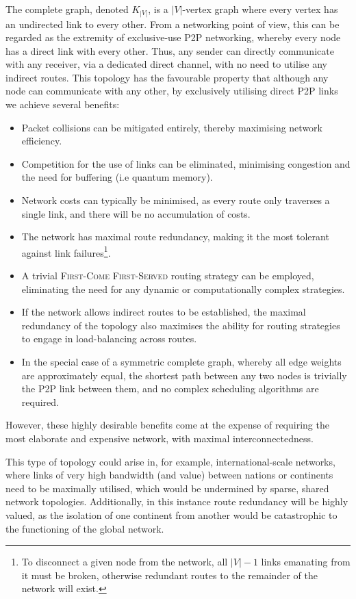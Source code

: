 \documentclass[aps,rmp,twocolumn,amsmath,amssymb,nofootinbib,superscriptaddress,longbibliography,floatfix,table-of-contents,eqsecnum]{revtex4-1}
\begin{document}
The complete graph, denoted $K_{|V|}$, is a $|V|$-vertex graph where every vertex has an undirected link to every other. From a networking point of view, this can be regarded as the extremity of exclusive-use P2P networking, whereby every node has a direct link with every other. Thus, any sender can directly communicate with any receiver, via a dedicated direct channel, with no need to utilise any indirect routes. This topology has the favourable property that although any node can communicate with any other, by exclusively utilising direct P2P links we achieve several benefits:
\begin{itemize}
\item Packet collisions can be mitigated entirely, thereby maximising network efficiency.
\item Competition for the use of links can be eliminated, minimising congestion and the need for buffering (i.e quantum memory).
\item Network costs can typically be minimised, as every route only traverses a single link, and there will be no accumulation of costs.
\item The network has maximal route redundancy, making it the most tolerant against link failures\footnote{To disconnect a given node from the network, all \mbox{$|V|-1$} links emanating from it must be broken, otherwise redundant routes to the remainder of the network will exist.}.
\item A trivial \textsc{First-Come First-Served} routing strategy can be employed, eliminating the need for any dynamic or computationally complex strategies.
\item If the network allows indirect routes to be established, the maximal redundancy of the topology also maximises the ability for routing strategies to engage in load-balancing across routes.
\item In the special case of a symmetric complete graph, whereby all edge weights are approximately equal, the shortest path between any two nodes is trivially the P2P link between them, and no complex scheduling algorithms are required.
\end{itemize}
However, these highly desirable benefits come at the expense of requiring the most elaborate and expensive network, with maximal interconnectedness.

This type of topology could arise in, for example, international-scale networks, where links of very high bandwidth (and value) between nations or continents need to be maximally utilised, which would be undermined by sparse, shared network topologies. Additionally, in this instance route redundancy will be highly valued, as the isolation of one continent from another would be catastrophic to the functioning of the global network.
\end{document}
